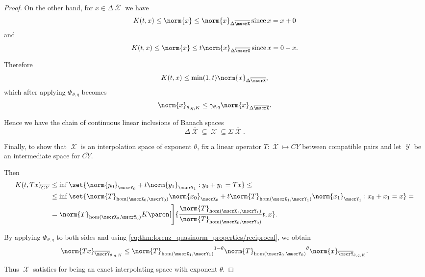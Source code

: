 \begin{proof}
  On the other hand, for \( x \in \Delta \overline{\mscrX} \) we have
  \begin{equation*}
    K(t, x) \leq \norm{x} \leq \norm{x}_{\Delta \overline{\mscrX}} \T{since} x = x + 0
  \end{equation*}
  and
  \begin{equation*}
    K(t, x) \leq \norm{x} \leq t \norm{x}_{\Delta \overline{\mscrX}} \T{since} x = 0 + x.
  \end{equation*}

  Therefore
  \begin{equation*}
    K(t, x) \leq \min(1, t) \norm{x}_{\Delta \overline{\mscrX}},
  \end{equation*}
  which after applying \( \Phi_{\theta,q} \) becomes
  \begin{equation*}
    \norm{x}_{\theta,q,K} \leq \gamma_{\theta,q} \norm{x}_{\Delta \overline{\mscrX}}.
  \end{equation*}

  Hence we have the chain of continuous linear inclusions of Banach spaces
  \begin{equation*}
    \Delta \overline{\mscrX} \subseteq \mscrX \subseteq \Sigma \overline{\mscrX}.
  \end{equation*}

  Finally, to show that \( \mscrX \) is an interpolation space of exponent \( \theta \), fix a linear operator \( T: \overline{\mscrX} \mapsto \overline{CY} \) between compatible pairs and let \( \mscrY \) be an intermediate space for \( \overline{CY} \).

  Then
  \begin{align*}
    K(t, Tx)_{\overline{CY}}
    &\leq
    \inf \set{ \norm{y_0}_{\mscrY_0} + t \norm{y_1}_{\mscrY_1} : y_0 + y_1 = Tx }
    \leq \\ &\leq
    \inf \set{ \norm{T}_{\hom(\mscrX_0, \mscrY_0)} \norm{x_0}_{\mscrX_0} + t \norm{T}_{\hom(\mscrX_1, \mscrY_1)} \norm{x_1}_{\mscrY_1} : x_0 + x_1 = x }
    = \\ &=
    \norm{T}_{\hom(\mscrX_0, \mscrY_0)} K\paren[\Bigg]{\frac {\norm{T}_{\hom(\mscrX_1, \mscrY_1)}} {\norm{T}_{\hom(\mscrX_0, \mscrY_0)}} t, x}.
  \end{align*}

  By applying \( \Phi_{\theta,q} \) to both sides and using \eqref{eq:thm:lorenz_quasinorm_properties/reciprocal}, we obtain
  \begin{equation*}
    \norm{Tx}_{\overline{\mscrY}_{\theta,q,K}}
    \leq
    {\norm{T}_{\hom(\mscrX_1, \mscrY_1)}}^{1 - \theta} {\norm{T}_{\hom(\mscrX_0, \mscrY_0)}}^{\theta} \norm{x}_{\overline{\mscrY}_{\theta,q,K}}.
  \end{equation*}

  Thus \( \mscrX \) satisfies  for being an exact interpolating space with exponent \( \theta \).
\end{proof}

